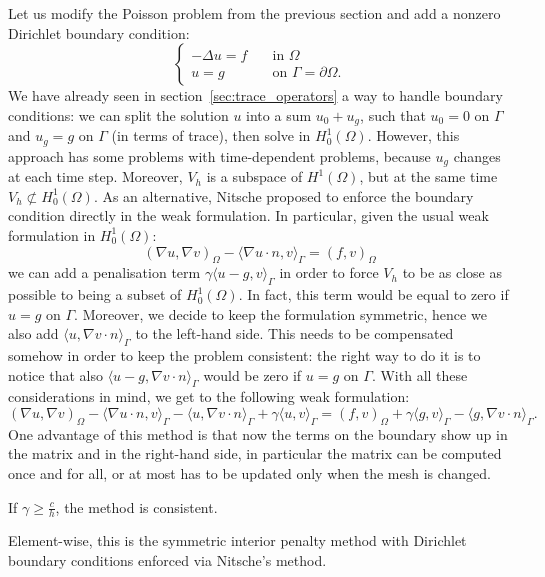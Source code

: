 Let us modify the Poisson problem from the previous section and add a nonzero Dirichlet boundary condition:
\begin{equation}\label{eqn:poisson_dbc1}
\begin{cases}
-\Delta u = f \quad &\text{in $\Omega$} \\
u = g \quad &\text{on $\Gamma = \partial\Omega$}.
\end{cases}
\end{equation}
We have already seen in section~\ref{sec:trace_operators} a way to handle boundary conditions: we can split the solution $u$ into a sum $u_0 + u_g$, such that $u_0 = 0$ on $\Gamma$ and $u_g = g$ on $\Gamma$ (in terms of trace), then solve in $H^1_0(\Omega)$. However, this approach has some problems with time-dependent problems, because $u_g$ changes at each time step. Moreover, $V_h$ is a subspace of $H^1(\Omega)$, but at the same time $V_h \not\subset H^1_0(\Omega)$. As an alternative, Nitsche proposed to enforce the boundary condition directly in the weak formulation. In particular, given the usual weak formulation in $H^1_0(\Omega)$:
\[
(\nabla u, \nabla v)_\Omega - \langle \nabla u \cdot n, v \rangle_\Gamma = (f,v)_\Omega
\]
we can add a penalisation term $\gamma \langle u-g, v \rangle_\Gamma$ in order to force $V_h$ to be as close as possible to being a subset of $H^1_0(\Omega)$.
In fact, this term would be equal to zero if $u = g$ on $\Gamma$. Moreover, we decide to keep the formulation symmetric, hence we also add $\langle u, \nabla v \cdot n \rangle_\Gamma$ to the left-hand side. This needs to be compensated somehow in order to keep the problem consistent: the right way to do it is to notice that also $\langle u-g, \nabla v \cdot n \rangle_\Gamma$ would be zero if $u = g$ on $\Gamma$. With all these considerations in mind, we get to the following weak formulation:
\[
(\nabla u, \nabla v)_\Omega - \langle \nabla u \cdot n, v \rangle_\Gamma - \langle u, \nabla v \cdot n \rangle_\Gamma + \gamma \langle u, v \rangle_\Gamma = (f,v)_\Omega + \gamma \langle g, v \rangle_\Gamma - \langle g, \nabla v \cdot n \rangle_\Gamma.
\]
One advantage of this method is that now the terms on the boundary show up in the matrix and in the right-hand side, in particular the matrix can be computed once and for all, or at most has to be updated only when the mesh is changed.

If $\gamma \ge \frac{c}{h}$, the method is consistent.

Element-wise, this is the symmetric interior penalty method with Dirichlet boundary conditions enforced via Nitsche's method. 
